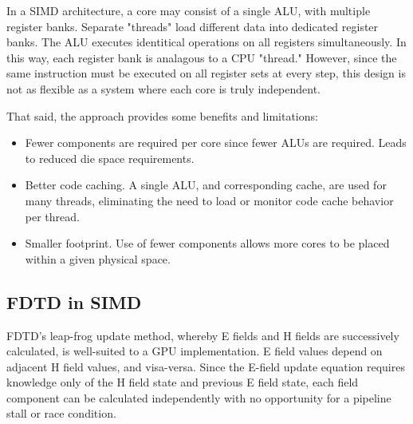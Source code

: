 In a SIMD\cite{Massingill:2007:SAP:1772070.1772078} architecture, a core may consist of a single ALU, with multiple register banks. Separate "threads" load different data into dedicated register banks. The ALU executes identitical operations on all registers simultaneously. In this way, each register bank is analagous to a CPU "thread." However, since the same instruction must be executed on all register sets at every step, this design is not as flexible as a system where each core is truly independent.

That said, the approach provides some benefits and limitations:

\begin{itemize}
	\item Fewer components are required per core since fewer ALUs are required. Leads to reduced die space requirements.
	\item Better code caching. A single ALU, and corresponding cache, are used for many threads, eliminating the need to load or monitor code cache behavior per thread.
	\item Smaller footprint. Use of fewer components allows more cores to be placed within a given physical space. 
\end{itemize}


\subsection{FDTD in SIMD}

FDTD's leap-frog update method, whereby E fields and H fields are successively calculated, is well-suited to a GPU implementation. E field values depend on adjacent H field values, and visa-versa. Since the E-field update equation requires knowledge only of the H field state and previous E field state, each field component can be calculated independently with no opportunity for a pipeline stall or race condition. 




